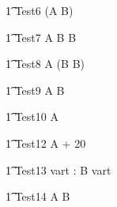 \begin{circusaction}
   \t1 Test6 \circdef  {} \rcirctime \circstartby (A  \circseq B)\\
\end{circusaction}

\begin{circusaction}
   \t1 Test7 \circdef  A \circseq B \circseq {} \rcirctime \circstartby B\\
\end{circusaction}

\begin{circusaction}
   \t1 Test8 \circdef  A \circseq (B \circseq {} \rcirctime \circstartby B)\\
\end{circusaction}

\begin{circusaction}
   \t1 Test9 \circdef  {} \rcirctime \circstartby A \circseq {} \rcirctime \circstartby B\\
\end{circusaction}



\begin{circusaction}
   \t1 Test10 \circdef  A \circendby {} \rcirctime   \\
\end{circusaction}



\begin{circusaction}
   \t1 Test12 \circdef  A \circendby {} + 20 \rcirctime   \\
\end{circusaction}

\begin{circusaction}
   \t1 Test13 \circdef \circvres vart : \nat  \circspot  B \circendby \lcirctime vart \rcirctime  \\
\end{circusaction}


\begin{circusaction}
   \t1 Test14 \circdef  A \circseq B \circendby {} \rcirctime  \\
\end{circusaction}

